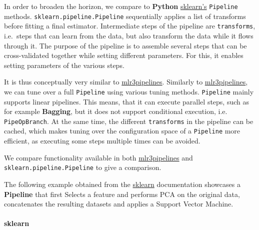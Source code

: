 \documentclass[]{article}
\let\oldparagraph\paragraph
\renewcommand{\paragraph}[1]{\oldparagraph{#1}\mbox{}}
\begin{document}
In order to broaden the horizon, we compare to \textbf{Python} \href{https://scikit-learn.org/stable/}{sklearn's} \texttt{Pipeline} methods.
\texttt{sklearn.pipeline.Pipeline} sequentially applies a list of transforms before fitting a final estimator.
Intermediate steps of the pipeline are \texttt{transforms}, i.e.~steps that can learn from the data, but also transform the data while it flows through it.
The purpose of the pipeline is to assemble several steps that can be cross-validated together while setting different parameters.
For this, it enables setting parameters of the various steps.

It is thus conceptually very similar to \href{https://cran.r-project.org/package=mlr3pipelines}{mlr3pipelines}.
Similarly to \href{https://cran.r-project.org/package=mlr3pipelines}{mlr3pipelines}, we can tune over a full \texttt{Pipeline} using various tuning methods.
\texttt{Pipeline} mainly supports linear pipelines.
This means, that it can execute parallel steps, such as for example \textbf{Bagging}, but it does not support conditional execution, i.e. \texttt{PipeOpBranch}.
At the same time, the different \texttt{transforms} in the pipeline can be cached, which makes tuning over the configuration space of a \texttt{Pipeline} more efficient, as executing some steps multiple times can be avoided.

We compare functionality available in both \href{https://cran.r-project.org/package=mlr3pipelines}{mlr3pipelines} and \texttt{sklearn.pipeline.Pipeline} to give a comparison.

The following example obtained from the \href{https://scikit-learn.org/stable/}{sklearn} documentation showcases a \textbf{Pipeline} that first Selects a feature and performs PCA on the original data, concatenates the resulting datasets and applies a Support Vector Machine.

\hypertarget{sklearn}{%
\paragraph{sklearn}\label{sklearn}}
\end{document}
